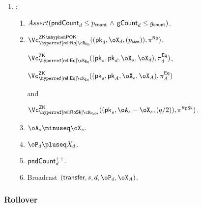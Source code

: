 \begin{protocol}
\begin{enumerate}
\begin{enumerate}
			
			\item Send $(\oX_s,\oX_d,\oX_A,\pi^\RPs,\pi^\Eqs_d,\pi^\Eqs_A,\pi^\RpSkS)$ to \Cc.   
		\end{enumerate}
		
		
		\item  \Cc: 
		
		\begin{enumerate}
			
			\item  ${Assert(\mathsf{pndCount}_d \le p_{\mathsf{count}} \,\land\, \mathsf{gCount}_d  \le g_{\mathsf{count}})}$.
				
			\item   $\vZKPOK{\rRp}((\pk_d,\oX_d,(\psizeCns)),\pi^\RPs)$,
			
			 $\vZK{\rEq}((\pk_s,\pk_d,\oX_s,\oX_d),\pi^\Eqs_d)$,
			 
			  $\vZK{\rEq}((\pk_s,\pk_A,\oX_s,\oX_A),\pi^\Eqs_A)$
			  
			  and
			 
			  $\vZK{\rRpSk}((\pk_s,\oA_s-\oX_s,(q/2)),\pi^\RpSkS)$. 
			
	
		
		
		     \item   $\oA_s\minuseq \oX_s$. 
              
              \item  $\oP_d \pluseq X_d$. 
              
              \item $\mathsf{pndCount}_d^{++}$.
              
		     
		     \item Broadcast $(\transfer,s,d,\oP_d,\oX_A)$.
		\end{enumerate}
		
	\end{enumerate}
	
\end{protocol}



\subsubsection{Rollover}

